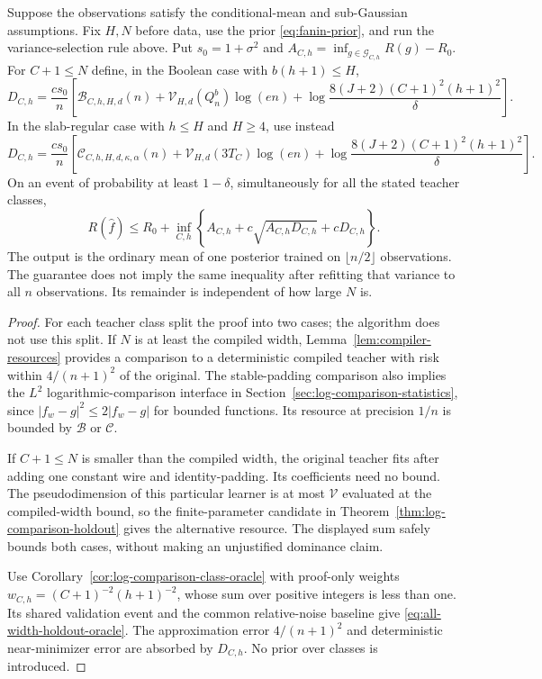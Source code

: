 \begin{theorem}
\label{thm:all-width-holdout}
Suppose the observations satisfy the conditional-mean and sub-Gaussian assumptions. Fix $H,N$ before data, use the prior \eqref{eq:fanin-prior}, and run the variance-selection rule above. Put $s_0=1+\sigma^2$ and
$A_{C,h}=\inf_{g\in\mathcal G_{C,h}}R(g)-R_0$.
For $C+1\le N$ define, in the Boolean case with $b(h+1)\le H$,
\[
 D_{C,h}=\frac{c s_0}{n}\left[
 \mathcal B_{C,h,H,d}(n)
 +\mathcal V_{H,d}(Q_n^b)\log(en)
 +\log\frac{8(J+2)(C+1)^2(h+1)^2}{\delta}\right].
\]
In the slab-regular case with $h\le H$ and $H\ge4$, use instead
\[
 D_{C,h}=\frac{c s_0}{n}\left[
 \mathcal C_{C,h,H,d,\kappa,\alpha}(n)
 +\mathcal V_{H,d}(3T_C)\log(en)
 +\log\frac{8(J+2)(C+1)^2(h+1)^2}{\delta}\right].
\]
On an event of probability at least $1-\delta$, simultaneously for all the stated teacher classes,
\begin{equation}
 R(\widehat f)\le R_0+
 \inf_{C,h}\left\{A_{C,h}+c\sqrt{A_{C,h}D_{C,h}}+cD_{C,h}\right\}.
 \label{eq:all-width-holdout-oracle}
\end{equation}
The output is the ordinary mean of one posterior trained on $\lfloor n/2\rfloor$ observations. The guarantee does not imply the same inequality after refitting that variance to all $n$ observations. Its remainder is independent of how large $N$ is.
\end{theorem}
\begin{proof}
For each teacher class split the proof into two cases; the algorithm does not use this split. If $N$ is at least the compiled width, Lemma~\ref{lem:compiler-resources} provides a comparison to a deterministic compiled teacher with risk within $4/(n+1)^2$ of the original. The stable-padding comparison also implies the $L^2$ logarithmic-comparison interface in Section~\ref{sec:log-comparison-statistics}, since $|f_w-g|^2\le2|f_w-g|$ for bounded functions. Its resource at precision $1/n$ is bounded by $\mathcal B$ or $\mathcal C$.

If $C+1\le N$ is smaller than the compiled width, the original teacher fits after adding one constant wire and identity-padding. Its coefficients need no bound. The pseudodimension of this particular learner is at most $\mathcal V$ evaluated at the compiled-width bound, so the finite-parameter candidate in Theorem~\ref{thm:log-comparison-holdout} gives the alternative resource. The displayed sum safely bounds both cases, without making an unjustified dominance claim.

Use Corollary~\ref{cor:log-comparison-class-oracle} with proof-only weights
$w_{C,h}=(C+1)^{-2}(h+1)^{-2}$, whose sum over positive integers is less than one. Its shared validation event and the common relative-noise baseline give \eqref{eq:all-width-holdout-oracle}. The approximation error $4/(n+1)^2$ and deterministic near-minimizer error are absorbed by $D_{C,h}$. No prior over classes is introduced.
\end{proof}

